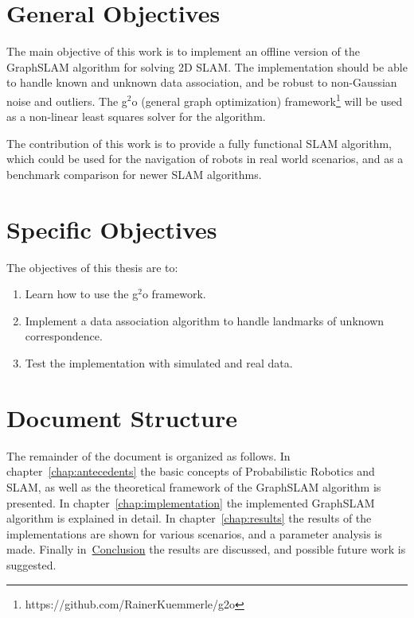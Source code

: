 \section{General Objectives}

The main objective of this work is to implement an offline version of the GraphSLAM algorithm for solving 2D SLAM. The implementation should be able to handle known and unknown data association, and be robust to non-Gaussian noise and outliers. The g$^2$o (general graph optimization) framework\footnote{https://github.com/RainerKuemmerle/g2o} will be used as a non-linear least squares solver for the algorithm.

The contribution of this work is to provide a fully functional SLAM algorithm, which could be used for the navigation of robots in real world scenarios, and as a benchmark comparison for newer SLAM algorithms.

\section{Specific Objectives}

The objectives of this thesis are to:

\begin{enumerate}
    \item Learn how to use the g$^2$o framework.
    \item Implement a data association algorithm to handle landmarks of unknown correspondence.
    \item Test the implementation with simulated and real data. 
\end{enumerate}

\section{Document Structure}

The remainder of the document is organized as follows. In chapter~\ref{chap:antecedents} the basic concepts of Probabilistic Robotics and SLAM, as well as the theoretical framework of the GraphSLAM algorithm is presented. In chapter~\ref{chap:implementation} the implemented GraphSLAM algorithm is explained in detail. In chapter~\ref{chap:results} the results of the implementations are shown for various scenarios, and a parameter analysis is made. Finally in~\hyperref[chap:conclusion]{Conclusion} the results are discussed, and possible future work is suggested. 
